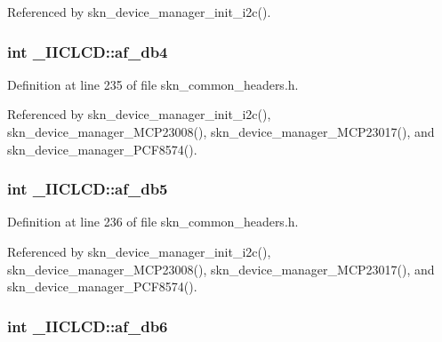 Referenced by skn\+\_\+device\+\_\+manager\+\_\+init\+\_\+i2c().

\subsubsection[{\texorpdfstring{af\+\_\+db4}{af_db4}}]{\setlength{\rightskip}{0pt plus 5cm}int \+\_\+\+I\+I\+C\+L\+C\+D\+::af\+\_\+db4}\hypertarget{struct___i_i_c_l_c_d_adbfc88b661d5da527aad6f5bcd45a85c}{}\label{struct___i_i_c_l_c_d_adbfc88b661d5da527aad6f5bcd45a85c}


Definition at line 235 of file skn\+\_\+common\+\_\+headers.\+h.



Referenced by skn\+\_\+device\+\_\+manager\+\_\+init\+\_\+i2c(), skn\+\_\+device\+\_\+manager\+\_\+\+M\+C\+P23008(), skn\+\_\+device\+\_\+manager\+\_\+\+M\+C\+P23017(), and skn\+\_\+device\+\_\+manager\+\_\+\+P\+C\+F8574().

\subsubsection[{\texorpdfstring{af\+\_\+db5}{af_db5}}]{\setlength{\rightskip}{0pt plus 5cm}int \+\_\+\+I\+I\+C\+L\+C\+D\+::af\+\_\+db5}\hypertarget{struct___i_i_c_l_c_d_a41c4536106493476b52c9a9df9dd8599}{}\label{struct___i_i_c_l_c_d_a41c4536106493476b52c9a9df9dd8599}


Definition at line 236 of file skn\+\_\+common\+\_\+headers.\+h.



Referenced by skn\+\_\+device\+\_\+manager\+\_\+init\+\_\+i2c(), skn\+\_\+device\+\_\+manager\+\_\+\+M\+C\+P23008(), skn\+\_\+device\+\_\+manager\+\_\+\+M\+C\+P23017(), and skn\+\_\+device\+\_\+manager\+\_\+\+P\+C\+F8574().

\subsubsection[{\texorpdfstring{af\+\_\+db6}{af_db6}}]{\setlength{\rightskip}{0pt plus 5cm}int \+\_\+\+I\+I\+C\+L\+C\+D\+::af\+\_\+db6}\hypertarget{struct___i_i_c_l_c_d_a0f3ebbe756ecf62494733287f64821f9}{}\label{struct___i_i_c_l_c_d_a0f3ebbe756ecf62494733287f64821f9}



